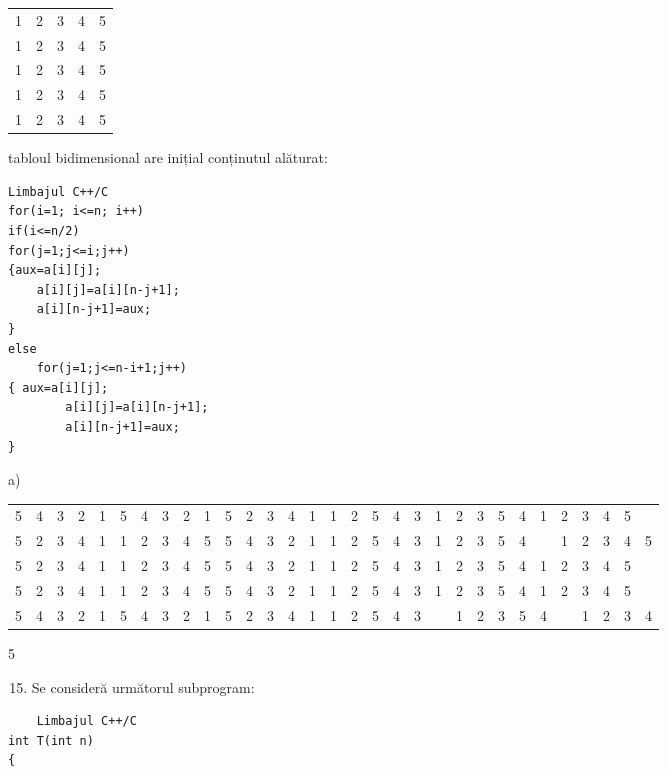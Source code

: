 \documentclass[10pt]{article}
\begin{document}
\begin{center}
\begin{tabular}{lllll}
1 & 2 & 3 & 4 & 5 \\
1 & 2 & 3 & 4 & 5 \\
1 & 2 & 3 & 4 & 5 \\
1 & 2 & 3 & 4 & 5 \\
1 & 2 & 3 & 4 & 5 \\
\end{tabular}
\end{center} tabloul bidimensional are inițial conținutul alăturat:

\begin{verbatim}
Limbajul C++/C
for(i=1; i<=n; i++)
if(i<=n/2)
for(j=1;j<=i;j++)
{aux=a[i][j];
    a[i][j]=a[i][n-j+1];
    a[i][n-j+1]=aux;
}
else
    for(j=1;j<=n-i+1;j++)
{ aux=a[i][j];
        a[i][j]=a[i][n-j+1];
        a[i][n-j+1]=aux;
}
\end{verbatim}

a)

\begin{center}
\begin{tabular}{lllllllllllllllllllllllllllllll}
5 & 4 & 3 & 2 & 1 & 5 & 4 & 3 & 2 & 1 & 5 & 2 & 3 & 4 & 1 & 1 & 2 & 5 & 4 & 3 & 1 & 2 & 3 & 5 & 4 & 1 & 2 & 3 & 4 & 5 &  \\
5 & 2 & 3 & 4 & 1 & 1 & 2 & 3 & 4 & 5 & 5 & 4 & 3 & 2 & 1 & 1 & 2 & 5 & 4 & 3 & 1 & 2 & 3 & 5 & 4 &  & 1 & 2 & 3 & 4 & 5 \\
5 & 2 & 3 & 4 & 1 & 1 & 2 & 3 & 4 & 5 & 5 & 4 & 3 & 2 & 1 & 1 & 2 & 5 & 4 & 3 & 1 & 2 & 3 & 5 & 4 & 1 & 2 & 3 & 4 & 5 &  \\
5 & 2 & 3 & 4 & 1 & 1 & 2 & 3 & 4 & 5 & 5 & 4 & 3 & 2 & 1 & 1 & 2 & 5 & 4 & 3 & 1 & 2 & 3 & 5 & 4 & 1 & 2 & 3 & 4 & 5 &  \\
5 & 4 & 3 & 2 & 1 & 5 & 4 & 3 & 2 & 1 & 5 & 2 & 3 & 4 & 1 & 1 & 2 & 5 & 4 & 3 &  & 1 & 2 & 3 & 5 & 4 &  & 1 & 2 & 3 & 4 \\
\end{tabular}
\end{center} 5

\begin{enumerate}
  \setcounter{enumi}{14}
  \item Se consideră următorul subprogram:
\end{enumerate}

\begin{verbatim}
    Limbajul C++/C
int T(int n)
{
\end{verbatim}
\end{document}
